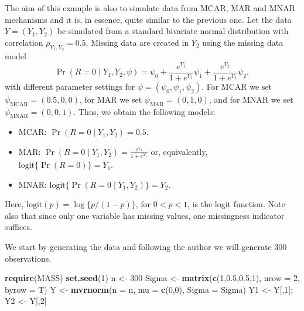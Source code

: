 \documentclass[
]{article}
\newenvironment{Shaded}{\begin{snugshade}}{\end{snugshade}}
\newcommand{\AttributeTok}[1]{\textcolor[rgb]{0.13,0.29,0.53}{#1}}
\newcommand{\DecValTok}[1]{\textcolor[rgb]{0.00,0.00,0.81}{#1}}
\newcommand{\FloatTok}[1]{\textcolor[rgb]{0.00,0.00,0.81}{#1}}
\newcommand{\FunctionTok}[1]{\textcolor[rgb]{0.13,0.29,0.53}{\textbf{#1}}}
\newcommand{\NormalTok}[1]{#1}
\newcommand{\OtherTok}[1]{\textcolor[rgb]{0.56,0.35,0.01}{#1}}
\begin{document}
The aim of this example is also to simulate data from MCAR, MAR and MNAR
mechanisms and it is, in essence, quite similar to the previous one. Let
the data \(Y=(Y_1,Y_2)\) be simulated from a standard bivariate normal
distribution with correlation \(\rho_{Y_1,Y_2}=0.5\). Missing data are
created in \(Y_2\) using the missing data model \[
\Pr(R=0\mid Y_1, Y_2,\psi)=\psi_0+\frac{e^{Y_1}}{1+e^{Y_1}}\psi_1+\frac{e^{Y_2}}{1+e^{Y_2}}\psi_2,
\] with different parameter settings for
\(\psi=(\psi_0,\psi_1,\psi_2)\). For MCAR we set
\(\psi_{\text{MCAR}}=(0.5,0,0)\), for MAR we set
\(\psi_{\text{MAR}}=(0,1,0)\), and for MNAR we set
\(\psi_{\text{MNAR}}=(0,0,1)\). Thus, we obtain the following models:

\begin{itemize}
\item
  MCAR: \(\Pr(R=0\mid Y_1, Y_2)=0.5\).
\item
  MAR: \(\Pr(R=0\mid Y_1, Y_2)=\frac{e^{Y_1}}{1+e^{Y_1}}\) or,
  equivalently, \(\text{logit}\{\Pr(R=0)\}=Y_1\).
\item
  MNAR: \(\text{logit}\{\Pr(R=0\mid Y_1, Y_2)\}=Y_2\).
\end{itemize}

Here, \(\text{logit}(p)=\log\{p/(1-p)\}\), for \(0<p<1\), is the logit
function. Note also that since only one variable has missing values, one
missingness indicator suffices.

We start by generating the data and following the author we will
generate \(300\) observations.

\begin{Shaded}
\begin{Highlighting}[]
\FunctionTok{require}\NormalTok{(MASS)}
\FunctionTok{set.seed}\NormalTok{(}\DecValTok{1}\NormalTok{)}
\NormalTok{n }\OtherTok{\textless{}{-}} \DecValTok{300}
\NormalTok{Sigma }\OtherTok{\textless{}{-}} \FunctionTok{matrix}\NormalTok{(}\FunctionTok{c}\NormalTok{(}\DecValTok{1}\NormalTok{,}\FloatTok{0.5}\NormalTok{,}\FloatTok{0.5}\NormalTok{,}\DecValTok{1}\NormalTok{), }\AttributeTok{nrow =} \DecValTok{2}\NormalTok{, }\AttributeTok{byrow =}\NormalTok{ T)}
\NormalTok{Y }\OtherTok{\textless{}{-}} \FunctionTok{mvrnorm}\NormalTok{(}\AttributeTok{n =}\NormalTok{ n, }\AttributeTok{mu =} \FunctionTok{c}\NormalTok{(}\DecValTok{0}\NormalTok{,}\DecValTok{0}\NormalTok{), }\AttributeTok{Sigma =}\NormalTok{ Sigma)}
\NormalTok{Y1 }\OtherTok{\textless{}{-}}\NormalTok{ Y[,}\DecValTok{1}\NormalTok{]; Y2 }\OtherTok{\textless{}{-}}\NormalTok{ Y[,}\DecValTok{2}\NormalTok{]}
\end{Highlighting}
\end{Shaded}
\end{document}
